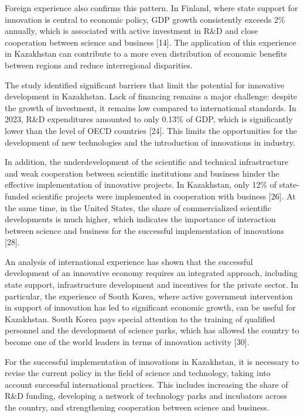 Foreign experience also confirms this pattern. In Finland, where state
support for innovation is central to economic policy, GDP growth
consistently exceeds 2\% annually, which is associated with active
investment in R\&D and close cooperation between science and business
{[}14{]}. The application of this experience in Kazakhstan can
contribute to a more even distribution of economic benefits between
regions and reduce interregional disparities.

The study identified significant barriers that limit the potential for
innovative development in Kazakhstan. Lack of financing remains a major
challenge: despite the growth of investment, it remains low compared to
international standards. In 2023, R\&D expenditures amounted to only
0.13\% of GDP, which is significantly lower than the level of OECD
countries {[}24{]}. This limits the opportunities for the development of
new technologies and the introduction of innovations in industry.

In addition, the underdevelopment of the scientific and technical
infrastructure and weak cooperation between scientific institutions and
business hinder the effective implementation of innovative projects. In
Kazakhstan, only 12\% of state-funded scientific projects were
implemented in cooperation with business {[}26{]}. At the same time, in
the United States, the share of commercialized scientific developments
is much higher, which indicates the importance of interaction between
science and business for the successful implementation of innovations
{[}28{]}.

An analysis of international experience has shown that the successful
development of an innovative economy requires an integrated approach,
including state support, infrastructure development and incentives for
the private sector. In particular, the experience of South Korea, where
active government intervention in support of innovation has led to
significant economic growth, can be useful for Kazakhstan. South Korea
pays special attention to the training of qualified personnel and the
development of science parks, which has allowed the country to become
one of the world leaders in terms of innovation activity {[}30{]}.

For the successful implementation of innovations in Kazakhstan, it is
necessary to revise the current policy in the field of science and
technology, taking into account successful international practices. This
includes increasing the share of R\&D funding, developing a network of
technology parks and incubators across the country, and strengthening
cooperation between science and business.

